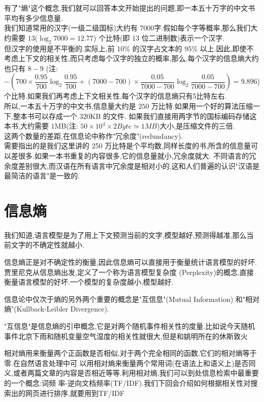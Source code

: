 \documentclass{article}
\begin{document}
有了"熵"这个概念,我们就可以回答本文开始提出的问题,即一本五十万字的中文书平均有多少信息量.\\
我们知道常用的汉字(一级二级国标)大约有 $7000 $字.假如每个字等概率,那么我们大约需要 $13$($\log_2{7000} = 12.77$) 个比特(即 $13$ 位二进制数)表示一个汉字.\\
但汉字的使用是不平衡的.实际上,前 1$0\%$ 的汉字占文本的 $95\%$ 以上.因此,即使不考虑上下文的相关性,而只考虑每个汉字的独立的概率,那么,每个汉字的信息熵大约也只有 $8-9$
(注: $ -(700 \times \dfrac{0.95}{700} \log_2{\dfrac{0.95}{700}} + (7000-700) \times \dfrac{0.05}{7000-700} \log_2{\dfrac{0.05}{7000-700}}) = 9.896$)
个比特.如果我们再考虑上下文相关性,每个汉字的信息熵只有5比特左右.\\
所以,一本五十万字的中文书,信息量大约是 $250$ 万比特.如果用一个好的算法压缩一下,整本书可以存成一个 $320$KB 的文件.
如果我们直接用两字节的国标编码存储这本书,大约需要 $1$MB(注: $50 \times 10^4 \times 2 Byte \simeq 1MB$)大小,是压缩文件的三倍.\\
这两个数量的差距,在信息论中称作"冗余度"(redundancy). \\
需要指出的是我们这里讲的 250 万比特是个平均数,同样长度的书,所含的信息量可以差很多.如果一本书重复的内容很多,它的信息量就小,冗余度就大.
不同语言的冗余度差别很大,而汉语在所有语言中冗余度是相对小的.这和人们普遍的认识"汉语是最简洁的语言"是一致的.

\section{信息熵}
我们知道,语言模型是为了用上下文预测当前的文字,模型越好,预测得越准,那么当前文字的不确定性就越小. 

信息熵正是对不确定性的衡量,因此信息熵可以直接用于衡量统计语言模型的好坏.
贾里尼克从信息熵出发,定义了一个称为语言模型复杂度 (Perplexity)的概念,直接衡量语言模型的好坏.一个模型的复杂度越小,模型越好.

信息论中仅次于熵的另外两个重要的概念是"互信息"(Mutual Information) 和"相对熵"(Kullback-Leibler Divergence). 

"互信息"是信息熵的引申概念,它是对两个随机事件相关性的度量.比如说今天随机事件北京下雨和随机变量空气湿度的相关性就很大,但是和姚明所在的休斯敦火

相对熵用来衡量两个正函数是否相似,对于两个完全相同的函数,它们的相对熵等于零.在自然语言处理中可 以用相对熵来衡量两个常用词(在语法上和语义上)是否同义,或者两篇文章的内容是否相近等等.利用相对熵,我们可以到处信息检索中最重要的一个概念:词频 率-逆向文档频率(TF/IDF).我们下回会介绍如何根据相关性对搜索出的网页进行排序,就要用到TF/IDF
\end{document}
